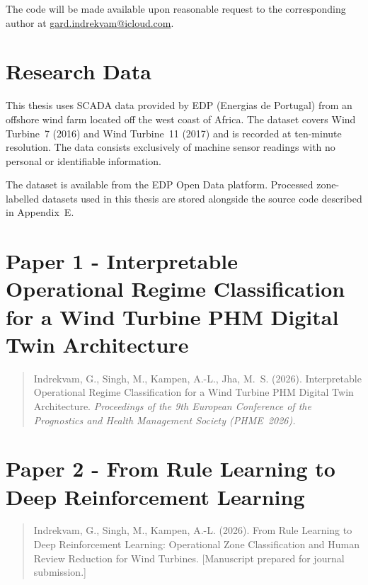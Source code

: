 The code will be made available upon reasonable request to the corresponding author at
\href{mailto:gard.indrekvam@icloud.com}{gard.indrekvam@icloud.com}.

\chapter{Research Data}
\label{app:data}

This thesis uses SCADA data provided by EDP (Energias de Portugal) from an offshore wind
farm located off the west coast of Africa. The dataset covers Wind Turbine~7 (2016) and
Wind Turbine~11 (2017) and is recorded at ten-minute resolution. The data consists
exclusively of machine sensor readings with no personal or identifiable information.

The dataset is available from the EDP Open Data platform. Processed zone-labelled
datasets used in this thesis are stored alongside the source code described in
Appendix~E.




\clearpage
\chapter{Paper 1 - Interpretable Operational Regime Classification for a Wind Turbine PHM Digital Twin Architecture}
\label{app:paper1}

\begin{quote}
\small
Indrekvam, G., Singh, M., Kampen, A.-L., Jha, M.~S. (2026).
Interpretable Operational Regime Classification for a Wind Turbine PHM Digital Twin
Architecture. \textit{Proceedings of the 9th European Conference of the Prognostics and
Health Management Society (PHME~2026).}
\end{quote}



\clearpage
\chapter{Paper 2 - From Rule Learning to Deep Reinforcement Learning}
\label{app:paper2}

\begin{quote}
\small
Indrekvam, G., Singh, M., Kampen, A.-L. (2026).
From Rule Learning to Deep Reinforcement Learning: Operational Zone Classification and
Human Review Reduction for Wind Turbines. [Manuscript prepared for journal submission.]
\end{quote}


